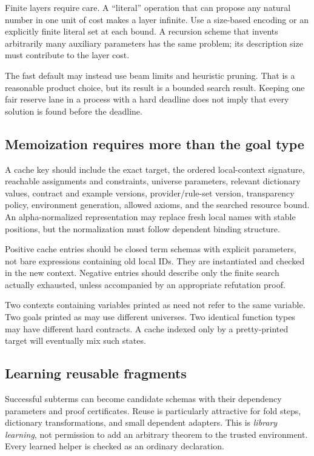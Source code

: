 \documentclass[11pt,letterpaper]{article}
\newcommand{\code}[1]{\texttt{\detokenize{#1}}}
\theoremstyle{definition}\newtheorem{definition}[theorem]{Definition}
\theoremstyle{remark}\newtheorem{remark}[theorem]{Remark}
\begin{document}
Finite layers require care. A ``literal'' operation that can propose any natural
number in one unit of cost makes a layer infinite. Use a size-based encoding or
an explicitly finite literal set at each bound. A recursion scheme that invents
arbitrarily many auxiliary parameters has the same problem; its description size
must contribute to the layer cost.

The fast default may instead use beam limits and heuristic pruning. That is a
reasonable product choice, but its result is a bounded search result. Keeping
one fair reserve lane in a process with a hard deadline does not imply that every
solution is found before the deadline.

\subsection{Memoization requires more than the goal type}

A cache key should include the exact target, the ordered local-context signature,
reachable assignments and constraints, universe parameters, relevant dictionary
values, contract and example versions, provider/rule-set version, transparency
policy, environment generation, allowed axioms, and the searched resource bound.
An alpha-normalized representation may replace fresh local names with stable
positions, but the normalization must follow dependent binding structure.

Positive cache entries should be closed term schemas with explicit parameters,
not bare expressions containing old local IDs. They are instantiated and checked
in the new context. Negative entries should describe only the finite search
actually exhausted, unless accompanied by an appropriate refutation proof.

Two contexts containing variables printed as \code{x} need not refer to the same
variable. Two goals printed as \code{A} may use different universes. Two identical
function types may have different hard contracts. A cache indexed only by a
pretty-printed target will eventually mix such states.

\subsection{Learning reusable fragments}

Successful subterms can become candidate schemas with their dependency
parameters and proof certificates. Reuse is particularly attractive for fold
steps, dictionary transformations, and small dependent adapters. This is
\emph{library learning}, not permission to add an arbitrary theorem to the trusted
environment. Every learned helper is checked as an ordinary declaration.
\end{document}
